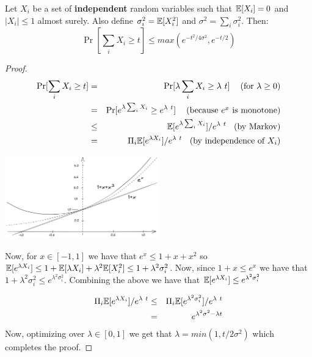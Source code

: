 \documentclass{article}
\begin{document}
\begin{theorem}
Let $X_i$ be a set of {\bf independent} random variables such that ${\mathbb E}[X_i] = 0$ and $|X_i| \le 1$ almost surely.
Also define $\sigma_i^2 = {\mathbb E}[X_i^2]$ and $\sigma^2 = \sum_i \sigma_i^2$. Then:
\[
\Pr[ \sum_i X_i \ge t ] \le max(e^{-t^2/4\sigma^2} , e^{-t/2})
\]
\end{theorem}
\begin{proof}
\begin{eqnarray}
\Pr[ \sum_i X_i \ge t ] &=& \Pr[ \lambda \sum_i X_i \ge \lambda  t ]  \mbox{\;\; (for $\lambda \ge 0$)} \\
&= &\Pr[ e^{\lambda \sum_i X_i} \ge e^{\lambda  t} ]   \mbox{\;\; (because $e^x$ is monotone)} \\
&\le &\E[e^{\lambda \sum_i X_i}] /e^{\lambda  t} \mbox{\;\; (by Markov)} \\
&=& \Pi_i \E[e^{\lambda X_i}] /e^{\lambda  t} \mbox{\;\; (by independence of $X_i$)} 
\end{eqnarray}

\begin{center}
\includegraphics[width=0.5\textwidth]{images/chernoff-exp-bounds.png}
\end{center}

Now, for $x \in [-1,1]$ we have that $e^x \le 1 + x + x^2$ so ${\mathbb E}[e^{\lambda X_i}] \le 1 + {\mathbb E}[\lambda X_i] + \lambda^2 {\mathbb E}[X_i^2] \le 1 + \lambda^2 \sigma^2_i$.
Now, since $1+x \le e^x$ we have that $1 + \lambda^2 \sigma^2_i \le e^{\lambda^2 \sigma_i^2}$. Combining the above we have that ${\mathbb E}[e^{\lambda X_i}] \le e^{\lambda^2 \sigma_i^2}$




\begin{eqnarray}
\Pi_i \E[e^{\lambda X_i}] /e^{\lambda  t} &\le& \Pi_i \E[e^{\lambda^2 \sigma_i^2}] /e^{\lambda  t}\\
&= & e^{\lambda^2 \sigma^2 - \lambda t}
\end{eqnarray}
Now, optimizing over $\lambda \in [0,1]$ we get that $\lambda = min(1,t/2\sigma^2)$ which completes the proof.
\end{proof}
\end{document}
